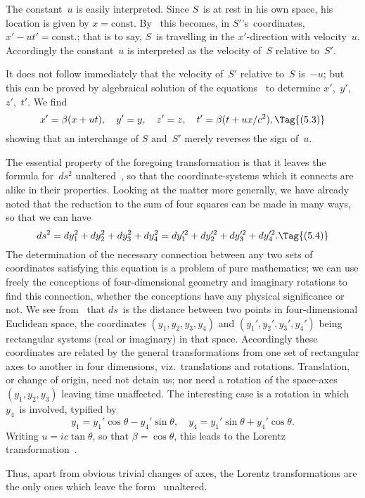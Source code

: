 \documentclass[12pt]{book}
\begin{document}
The constant~$u$ is easily interpreted. Since $S$~is at rest in his own space,
his location is given by $x = \text{const}$. By~ this becomes, in $S'$'s~coordinates,
$x' - ut' = \text{const.}$; that is to say, $S$~is travelling in the $x'$-direction with velocity~$u$.
Accordingly the constant~$u$ is interpreted as the velocity of~$S$ relative to~$S'$.

It does not follow immediately that the velocity of~$S'$ relative to~$S$ is~$-u$;
but this can be proved by algebraical solution of the equations~ to
determine $x'$,~$y'$, $z'$,~$t'$. We find
\[
x' = \beta(x + ut),\quad
y' = y,\quad
z' = z,\quad
t' = \beta(t + ux/c^2),
\Tag{(5.3)}
\]
showing that an interchange of $S$ and~$S'$ merely reverses the sign of~$u$.

The essential property of the foregoing transformation is that it leaves
the formula for~$ds^2$ unaltered~, so that the coordinate\hyp{}systems which it
connects are alike in their properties. Looking at the matter more generally,
we have already noted that the reduction to the sum of four squares can be
made in many ways, so that we can have
\[
ds^2 = dy_1^2 + dy_2^2 + dy_3^2 + dy_4^2 = dy_1'^2 + dy_2'^2 + dy_3'^2 + dy_4'^2.
\Tag{(5.4)}
\]
The determination of the necessary connection between any two sets of
coordinates satisfying this equation is a problem of pure mathematics; we
can use freely the conceptions of four\hyp{}dimensional geometry and imaginary
rotations to find this connection, whether the conceptions have any physical
significance or not. We see from~ that $ds$~is the distance between two
points in four\hyp{}dimensional Euclidean space, the coordinates $(y_1, y_2, y_3, y_4)$ and
$(y_1', y_2', y_3', y_4')$ being rectangular systems (real or imaginary) in that space.
Accordingly these coordinates are related by the general transformations from
one set of rectangular axes to another in four dimensions, viz.\ translations
and rotations. Translation, or change of origin, need not detain us; nor need
a rotation of the space-axes $(y_1, y_2, y_3)$ leaving time unaffected. The interesting
case is a rotation in which $y_4$~is involved, typified by
\[
y_1 = y_1' \cos\theta - y_4' \sin\theta,\quad
y_4 = y_1' \sin\theta + y_4' \cos\theta.
\]
Writing $u = ic \tan\theta$, so that $\beta = \cos\theta$, this leads to the Lorentz transformation~.

Thus, apart from obvious trivial changes of axes, the Lorentz transformations
are the only ones which leave the form~ unaltered.
\end{document}
